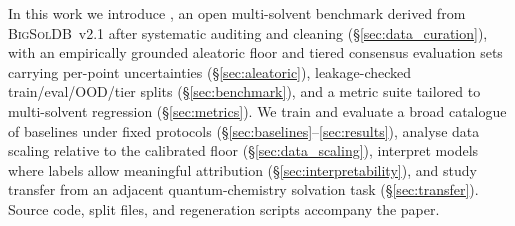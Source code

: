 In this work we introduce \scthree{}, an open multi-solvent benchmark derived from \textsc{BigSolDB}~v2.1 after systematic auditing and cleaning (§\ref{sec:data_curation}), with an empirically grounded aleatoric floor and tiered consensus evaluation sets carrying per-point uncertainties (§\ref{sec:aleatoric}), leakage-checked train/eval/OOD/tier splits (§\ref{sec:benchmark}), and a metric suite tailored to multi-solvent regression (§\ref{sec:metrics}). We train and evaluate a broad catalogue of baselines under fixed protocols (§\ref{sec:baselines}--\ref{sec:results}), analyse data scaling relative to the calibrated floor (§\ref{sec:data_scaling}), interpret models where labels allow meaningful attribution (§\ref{sec:interpretability}), and study transfer from an adjacent quantum-chemistry solvation task (§\ref{sec:transfer}). Source code, split files, and regeneration scripts accompany the paper.
